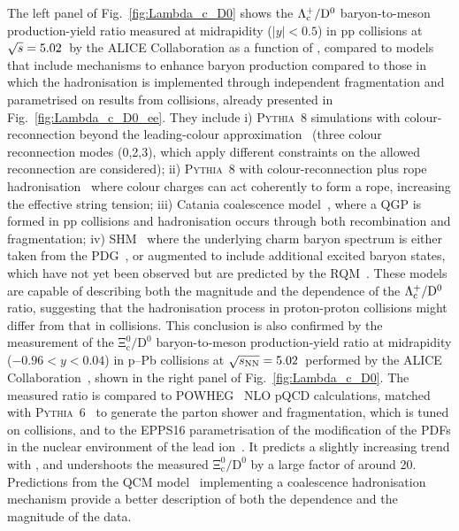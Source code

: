 The left panel of Fig.~\ref{fig:Lambda_c_D0} shows the $\mathrm{\mathrm{\Lambda_c^+}/D^0}$ baryon-to-meson production-yield ratio measured at midrapidity ($\lvert y\rvert < 0.5$) in pp collisions at $\sqrt{s} = 5.02$~\tev by the ALICE Collaboration as a function of \pt, compared to models that include mechanisms to enhance baryon production compared to those in which the hadronisation is implemented through independent fragmentation and parametrised on results from \ee collisions, already presented in Fig.~\ref{fig:Lambda_c_D0_ee}. They include i) \textsc{Pythia}~8 simulations with colour-reconnection beyond the leading-colour approximation~\cite{Christiansen:2015yqa} (three colour reconnection modes (0,2,3), which apply different constraints on the allowed reconnection are considered); ii) \textsc{Pythia}~8 with colour-reconnection plus rope hadronisation~\cite{Bierlich:2014xba} where colour charges can act coherently to form a rope, increasing the effective string tension; iii) Catania coalescence model~\cite{Minissale:2020bif}, where a QGP is formed in pp collisions and hadronisation occurs through both recombination and fragmentation; iv) SHM~\cite{Braun-Munzinger:2003pwq} where the underlying charm baryon spectrum is either taken from the PDG~\cite{pdg}, or augmented to include additional excited baryon states, which have not yet been observed but are predicted by the RQM~\cite{Ebert:2011kk}. These models are capable of describing both the magnitude and the \pt dependence of the $\mathrm{\mathrm{\Lambda_c^+}/D^0}$ ratio, suggesting that the hadronisation process in proton-proton collisions might differ from that in \ee collisions. This conclusion is also confirmed by the measurement of the $\mathrm{\Xi_c^0/D^0}$ baryon-to-meson production-yield ratio at midrapidity ($-0.96<y<0.04$) in p--Pb collisions at $\sqrt{s_\mathrm{NN}} = 5.02$~\tev performed by the ALICE Collaboration~\cite{ALICE:2024ozd}, shown in the right panel of Fig.~\ref{fig:Lambda_c_D0}. The measured ratio is compared to POWHEG~\cite{Frixione:2007nw} NLO pQCD calculations, matched with \textsc{Pythia}~6~\cite{Sjostrand:2006za} to generate the parton shower and fragmentation, which is tuned on \ee collisions, and to the EPPS16  parametrisation of the modification of the PDFs in the nuclear environment of the lead ion~\cite{Eskola:2016oht}. It predicts a slightly increasing trend with \pt, and undershoots the measured $\mathrm{\Xi_c^0/D^0}$ by a large factor of around 20. Predictions from the QCM model~\cite{Song:2018tpv} implementing a coalescence hadronisation mechanism provide a better description of both the \pt dependence and the magnitude of the data. 

